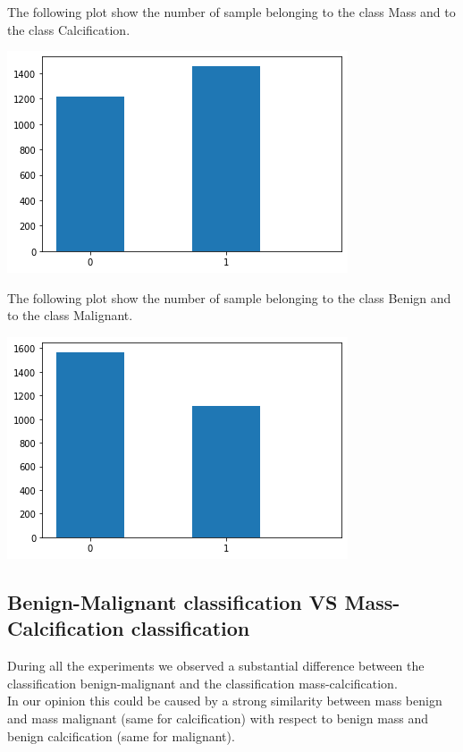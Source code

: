 \documentclass{article}
\begin{document}
The following plot show the number of sample belonging to the class Mass and to the class Calcification.\\
\begin{minipage}{\linewidth}
\begin{center}
\vspace{3mm}
\includegraphics[scale=0.6]{./img/distribution3.png} 
\vspace{3mm}
\end{center}
\end{minipage}
The following plot show the number of sample belonging to the class Benign and to the class Malignant.\\
\begin{minipage}{\linewidth}
\begin{center}
\vspace{3mm}
\includegraphics[scale=0.6]{./img/distribution4.png} 
\vspace{3mm}
\end{center}
\end{minipage}

\subsection{Benign-Malignant classification VS Mass-Calcification classification}
During all the experiments we observed a substantial difference between the classification benign-malignant and the classification mass-calcification.\\ 
In our opinion this could be caused by a strong similarity between mass benign and mass malignant (same for calcification) with respect to benign mass and benign calcification (same for malignant).
\end{document}
